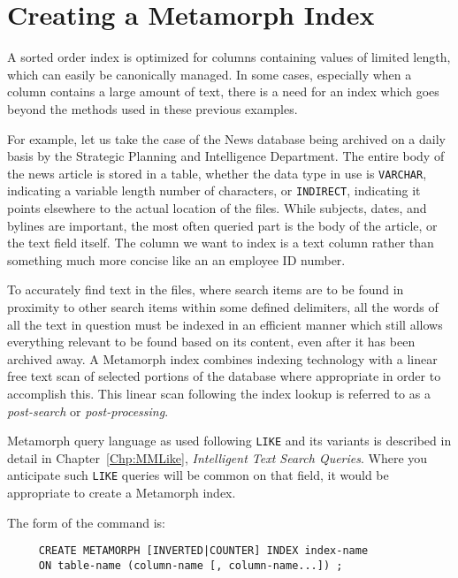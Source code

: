 \section{Creating a Metamorph Index}

A sorted order index is optimized for columns containing values of
limited length, which can easily be canonically managed.  In some
cases, especially when a column contains a large amount of text, there
is a need for an index which goes beyond the methods used in these
previous examples.

For example, let us take the case of the News database being archived
on a daily basis by the Strategic Planning and Intelligence
Department.  The entire body of the news article is stored in a table,
whether the data type in use is \verb`VARCHAR`, indicating a variable length
number of characters, or \verb`INDIRECT`, indicating it points elsewhere to
the actual location of the files.  While subjects, dates, and bylines
are important, the most often queried part is the body of the article,
or the text field itself.  The column we want to index is a text
column rather than something much more concise like an an employee ID
number.

To accurately find text in the files, where search items are to be
found in proximity to other search items within some defined
delimiters, all the words of all the text in question must be indexed
in an efficient manner which still allows everything relevant to be
found based on its content, even after it has been archived away.  A
Metamorph index combines indexing technology with a linear free text
scan of selected portions of the database where appropriate in order
to accomplish this.  This linear scan following the index lookup is
referred to as a {\em post-search} or {\em post-processing}.

Metamorph query language as used following \verb`LIKE` and its
variants is described in detail in Chapter~\ref{Chp:MMLike}, {\em
Intelligent Text Search Queries}.  Where you anticipate such
\verb`LIKE` queries will be common on that field, it would be
appropriate to create a Metamorph index.

The form of the command is:

\begin{verbatim}
     CREATE METAMORPH [INVERTED|COUNTER] INDEX index-name
     ON table-name (column-name [, column-name...]) ;
\end{verbatim}

